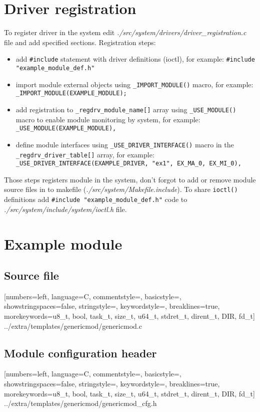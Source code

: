 \documentclass[a4paper,11pt]{report}
\renewcommand{\path}[1]{\textit{#1}}
\newcommand{\code}[1]{\texttt{#1}}
\newcommand{\includecode}[1]{
    [numbers=left, language=C, commentstyle=\color{commcolor}, basicstyle=\scriptsize\ttfamily,
    showstringspaces=false, stringstyle=\color{stringcolor}, keywordstyle=\color{keywordcolor},
    breaklines=true,
    morekeywords={u8_t, bool, task_t, size_t, u64_t, stdret_t, dirent_t, DIR, fd_t}]
    {#1}}
\begin{document}
\section{Driver registration}
To register driver in the system edit \path{./src/system/drivers/driver\_registration.c} file and
add specified sections. Registration steps:
\begin{itemize}
   \item add \code{\#include} statement with driver definitions (ioctl),
         for example:
         \newline\code{\#include "example\_module\_def.h"}
   \item import module external objects using \code{\_IMPORT\_MODULE()} macro,
         for example:
         \newline\code{\_IMPORT\_MODULE(EXAMPLE\_MODULE);}
   \item add registration to \code{\_regdrv\_module\_name[]} array using \code{\_USE\_MODULE()}
         macro to enable module monitoring by system, for example:
         \newline\code{\_USE\_MODULE(EXAMPLE\_MODULE),}
   \item define module interfaces using \code{\_USE\_DRIVER\_INTERFACE()} macro in the
         \code{\_regdrv\_driver\_table[]} array, for example:
         \newline\code{\_USE\_DRIVER\_INTERFACE(EXAMPLE\_DRIVER, "ex1", EX\_MA\_0, EX\_MI\_0),}
\end{itemize}
Those steps registers module in the system, don't forgot to add or remove module source files in to
makefile (\path{./src/system/Makefile.include}). To share \code{ioctl()} definitions add
\code{\#include "example\_module\_def.h"} code to \path{./src/system/include/system/ioctl.h}
file.

\section{Example module}
\subsection{Source file}
\includecode{../extra/templates/genericmod/genericmod.c}

\subsection{Module configuration header}
\includecode{../extra/templates/genericmod/genericmod_cfg.h}
\end{document}
